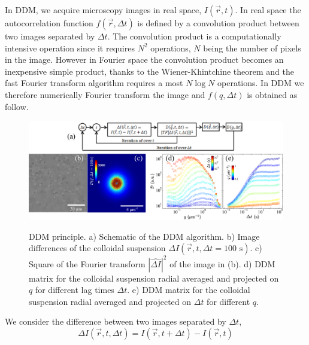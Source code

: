\documentclass[prb,reprint,amsmath,amssymb]{revtex4-1}
\newcommand{\tg}[1]{{\color{magenta}#1}} %
\begin{document}
\tg{In DDM, we acquire microscopy images in real space, $I(\vec{r}, t)$. In real space the autocorrelation function $f(\vec{r}, \Delta t)$ is defined by a convolution product between two images separated by $\Delta t$. The convolution product is a computationally intensive operation since it requires $N^2$ operations, $N$ being the number of pixels in the image. However in Fourier space the convolution product becomes an inexpensive simple product, thanks to the Wiener-Khintchine theorem and the fast Fourier transform algorithm requires a most $N\log N$ operations}. In DDM  we therefore numerically Fourier transform the image and $f(q, \Delta t)$ is obtained as follow.

\begin{figure}
	\includegraphics[width=\linewidth]{Graph.pdf}\\
	\caption{\tg{DDM principle. a) Schematic of the DDM algorithm. b) Image differences of the colloidal suspension $\Delta I(\vec{r}, t,\Delta t=100 \text{ s})$. c) Square of the Fourier transform $|\widehat{\Delta I}|^2$ of the image in  (b). d) DDM matrix for the colloidal suspension radial averaged and projected on $q$ for different lag times $\Delta t$. e) DDM matrix for the colloidal suspension radial averaged and projected on $\Delta t$ for different $q$.}}
	\label{D}
\end{figure}

 We consider the difference between two images separated by $\Delta t$,
\begin{equation}
\Delta I(\vec{r},t, \Delta t) = I(\vec{r}, t+\Delta t) - I(\vec{r}, t)
\label{eq:DI}
\end{equation}
\end{document}
